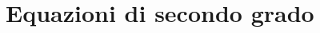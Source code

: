 
\newcommand{\eqdue}[3]{%
\begin{align*}
x_{1,2} = \dfrac{-b \mp \sqrt{b^2 -4ac}}{2a} = #1
 \begin{array}{l}
  \nearrow\\
  \searrow
 \end{array}
 \begin{array}{l}
  x_1 = #2\\[.8em]
  x_2 = #3
 \end{array}
\end{align*}
}

\newcommand{\eqduerid}[3]{%
\begin{align*}
x_{1,2} = \dfrac{-\beta \mp \sqrt{\beta^2 -ac}}{a} = #1
 \begin{array}{l}
  \nearrow\\
  \searrow
 \end{array}
 \begin{array}{l}
  x_1 = #2\\[.8em]
  x_2 = #3
 \end{array}
\end{align*}
}

\newcommand{\eqdeltazero}[2]{%
\[
x_{1,2} = \dfrac{-b \mp \sqrt{b^2 -4ac}}{2a} = #1 = #2
\]
}

\chapter{Equazioni di secondo grado}

%   

